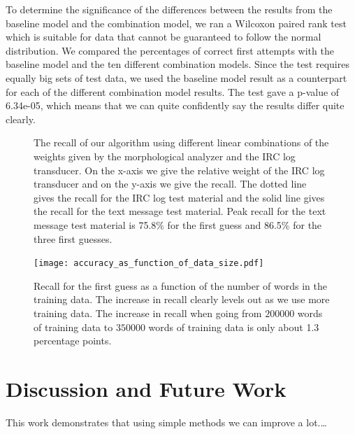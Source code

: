\documentclass[a4paper,conference]{IEEEtran}
\begin{document}
To determine the significance of the differences between the results from the baseline model and the combination model, we ran a Wilcoxon paired rank test which is suitable for data that cannot be guaranteed to follow the normal distribution. We compared the percentages of correct first attempts with the baseline model and the ten different combination models. Since the test requires equally big sets of test data, we used the baseline model result as a counterpart for each of the different combination model results. The test gave a p-value of 6.34e-05, which means that we can quite confidently say the results differ quite clearly.



\begin{figure}[!t]
\centerline{
\hfil
{}}
\caption{The recall of our algorithm using different linear combinations of the weights given by the morphological analyzer and the IRC log transducer. On the x-axis we give the relative weight of the IRC log transducer and on the y-axis we give the recall. The dotted line gives the recall for the IRC log test material and the solid line gives the recall for the text message test material. Peak recall for the text message test material is 75.8\% for the first guess and 86.5\% for the three first guesses.}
\label{fig:AccuraciesIRCMaterial}
\end{figure}

\begin{figure}[!t]
\begin{center}
\texttt{[image: accuracy\_as\_function\_of\_data\_size.pdf]}
\end{center}
\caption{Recall for the first guess as a function of the number of words in the training data. The increase in recall clearly levels out as we use more training data. The increase in recall when going from $200000$ words of training data to $350000$ words of training data is only about 1.3 percentage points.}
\label{fig:SaturationGraph}
\end{figure}

\section{Discussion and Future Work}
\label{sec:discussion}

This work demonstrates that using simple methods we can improve a lot.\ldots
\end{document}
